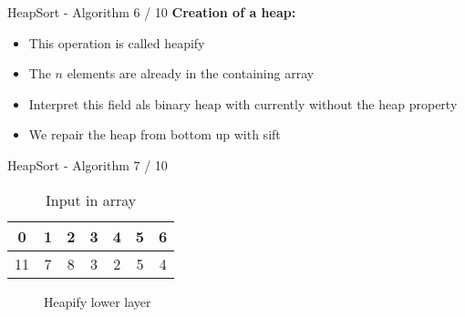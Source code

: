 
\begin{frame}{HeapSort - Algorithm 6 / 10}
  \textbf{Creation of a heap:}
  \begin{itemize}
    \item
      This operation is called {\color{MainA}heapify}
    \item
      The {\color{MainA}$n$} elements are already in the containing array
    \item
      Interpret this field als binary heap with currently without the
      {\color{MainA}heap property}
    \item
      We repair the heap from bottom up with {\color{MainA}sift}
  \end{itemize}
\end{frame}


\begin{frame}{HeapSort - Algorithm 7 / 10}
  \vspace{-1.0em}
  \begin{table}[!h]%
    \caption{Input in array}%
    \label{tab:heapify_numbers}%
    \begin{tabular}{ccccccc}
      {\color{MainB}0}&
      {\color{MainB}1}&
      {\color{MainB}2}&
      {\color{MainB}3}&
      {\color{MainB}4}&
      {\color{MainB}5}&
      {\color{MainB}6}\\
      \hline
      \multicolumn{1}{|c}{11}&%
      \multicolumn{1}{|c}{7}&%
      \multicolumn{1}{|c}{8}&%
      \multicolumn{1}{|c}{3}&%
      \multicolumn{1}{|c}{2}&%
      \multicolumn{1}{|c}{5}&%
      \multicolumn{1}{|c|}{4}\\
      \hline
    \end{tabular}
  \end{table}
  \vspace*{-0.5em}
  \begin{centering}
    \begin{figure}[!h]%
      \begin{columns}%
        \begin{column}{0.425\textwidth}%
          \begin{adjustbox}{width=\linewidth}%
          \end{adjustbox}%
        \end{column}%
        \begin{column}{0.425\textwidth}%
          \begin{adjustbox}{width=\linewidth}%
          \end{adjustbox}%
        \end{column}%
      \end{columns}%
      \caption{Heapify lower layer}%
      \label{fig:heapify_lower}%
    \end{figure}
  \end{centering}
\end{frame}

